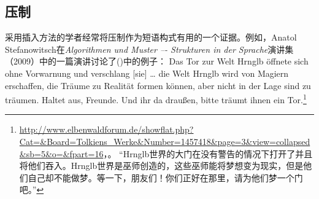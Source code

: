 \addlines
\subsection{压制}
\label{coercion-sec}
    采用插入方法的学者经常将压制作为短语构式有用的一个证据。例如，Anatol Stefanowitsch在\emph{Algorithmen und Muster –-
  Strukturen in der Sprache}演讲集（2009）中的一篇演讲讨论了()中的例子：\ea
Das Tor zur Welt Hrnglb öffnete sich ohne Vorwarnung
und verschlang [sie] \ldots{} die Welt Hrnglb wird von Magiern
erschaffen, die Träume zu Realität formen können, aber
nicht in der Lage sind zu träumen. Haltet aus, Freunde.
Und ihr da draußen, bitte träumt ihnen ein Tor.\footnote{
\url{http://www.elbenwaldforum.de/showflat.php?Cat=&Board=Tolkiens_Werke&Number=1457418&page=3&view=collapsed&sb=5&o=&fpart=16}，。
“Hrnglb世界的大门在没有警告的情况下打开了并且将他们吞入。Hrnglb世界是巫师创造的，这些巫师能将梦想变为现实，但是他们自己却不能做梦。等一下，朋友们！你们正好在那里，请为他们梦一个门吧。”
}
\z

